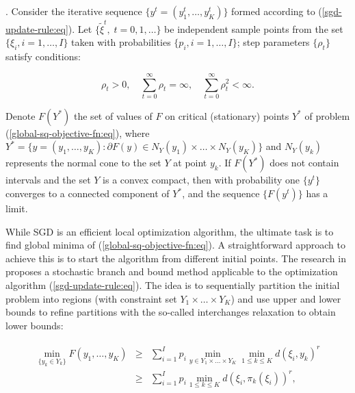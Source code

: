 \begin{theorem}
    \label{Theorem 1}
    \cite{Ermoliev_Norkin_2003,Ermolev_Norkin_1998}. Consider the iterative sequence $\{ y^t = (y_1^t, \ldots, y_K^t) \}$ formed according to (\ref{sgd-update-rule:eq}). Let $\{ \tilde{\xi}^t,\;t=0,1,\ldots\}$ be independent sample points from the set $\{ \xi_i, i = 1, \ldots, I \}$ taken with probabilities $\{ p_i, i = 1, \ldots, I \}$; step parameters $\{\rho_t\}$ satisfy conditions:

    \begin{equation}
        \label{sq-convergence-cond:eq}
        \rho_t > 0, \quad \sum_{t=0}^{\infty} \rho_t = \infty, \quad \sum_{t=0}^{\infty} \rho_t^2 < \infty.
    \end{equation}

    Denote $F(Y^{*})$ the set of values of $F$ on critical (stationary) points $Y^{*}$ of problem (\ref{global-sq-objective-fn:eq}), where $Y^{*} = \{ y = (y_1, \ldots, y_K): \partial F(y) \in N_Y (y_1) \times \ldots \times N_Y (y_K) \}$ and $N_Y (y_k)$ represents the normal cone to the set $Y$ at point $y_k$. If $F(Y^{*})$ does not contain intervals and the set $Y$ is a convex compact, then with probability one $\{ y^t \}$ converges to a connected component of $Y^{*}$, and the sequence $\{ F(y^t) \}$ has a limit.
\end{theorem}

While SGD is an efficient local optimization algorithm, the ultimate task is to find global minima of (\ref{global-sq-objective-fn:eq}). A straightforward approach to achieve this is to start the algorithm from different initial points. The research in \cite{Norkin_Pflug_Ruszczynski_1998} proposes a stochastic branch and bound method applicable to the optimization algorithm (\ref{sgd-update-rule:eq}). The idea is to sequentially partition the initial problem into regions (with constraint set $Y_1 \times \ldots \times Y_K$) and use upper and lower bounds to refine partitions with the so-called interchanges relaxation to obtain lower bounds:

\begin{eqnarray}
    \label{sq-branch-bound:eq}
    \begin{aligned}
        \min_{\{ y_k \in Y_k \}} F(y_1, \ldots, y_K)
        &\geq& \sum_{i=1}^I p_i \min_{y \in Y_1\times\ldots\times Y_K} \min_{1 \leq k \leq K} d(\xi_i, y_k)^r \\
        &\geq& \sum_{i=1}^I p_i \min_{1 \leq k \leq K} d(\xi_i, \pi_k(\xi_i))^r,
    \end{aligned}
\end{eqnarray}


